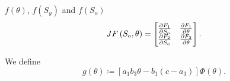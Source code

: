 \documentclass[
    8pt,
    aspectratio=1610,
    c,
    intlimits,
    leqno,
    professionalfonts,
]{beamer}
\begin{document}
\begin{frame}
\begin{block}{$f\left(\theta\right)$,
			$f\left(S_{y}\right)$ and $f\left(S_{\text{o}}\right)$}
		\begin{equation*}
			JF\left(S_{\text{o}},\theta\right)=
			\begin{bmatrix}
				\diffp{F_{1}}{S_{\text{o}}} & \diffp{F_{1}}{\theta} \\
				\diffp{F_{2}}{S_{\text{o}}} & \diffp{F_{2}}{\theta}
			\end{bmatrix}.
		\end{equation*}

		We define
		\setcounter{equation}{38}
		\begin{equation}
			g\left(\theta\right)\coloneqq
			\left[
				a_{1}
				b_{3}
				\theta-
				b_{1}
				\left(c-a_{3}\right)
				\right]
			\Phi\left(\theta\right).\label{eq:39}
		\end{equation}
	\end{block}
\end{frame}
\end{document}
